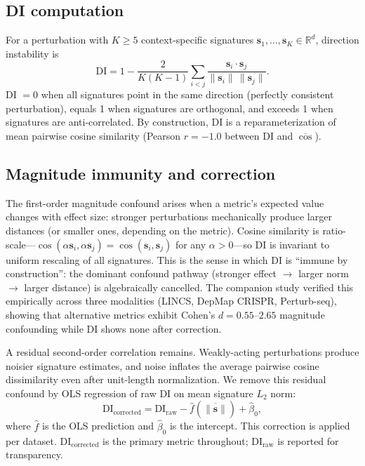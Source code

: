 \documentclass[11pt]{article}
\begin{document}
\subsection{DI computation}

For a perturbation with $K \geq 5$ context-specific signatures
$\mathbf{s}_1, \ldots, \mathbf{s}_K \in \mathbb{R}^d$, direction
instability is
\begin{equation}
\mathrm{DI} = 1 - \frac{2}{K(K-1)} \sum_{i < j}
\frac{\mathbf{s}_i \cdot \mathbf{s}_j}
     {\|\mathbf{s}_i\| \, \|\mathbf{s}_j\|}.
\label{eq:di}
\end{equation}
DI $= 0$ when all signatures point in the same direction (perfectly
consistent perturbation), equals 1 when signatures are orthogonal,
and exceeds 1 when signatures are anti-correlated.  By
construction, DI is a reparameterization of mean pairwise cosine
similarity (Pearson $r = -1.0$ between DI and $\overline{\cos}$).

\subsection{Magnitude immunity and correction}

The first-order magnitude confound arises when a metric's expected value
changes with effect size: stronger perturbations mechanically produce
larger distances (or smaller ones, depending on the metric).  Cosine
similarity is ratio-scale---$\cos(\alpha \mathbf{s}_i,
\alpha \mathbf{s}_j) = \cos(\mathbf{s}_i, \mathbf{s}_j)$ for any
$\alpha > 0$---so DI is invariant to uniform rescaling of all
signatures.  This is the sense in which DI is ``immune by
construction'': the dominant confound pathway (stronger effect
$\to$ larger norm $\to$ larger distance) is algebraically cancelled.
The companion study \citep{tower2026confound} verified this empirically
across three modalities (LINCS, DepMap CRISPR, Perturb-seq), showing
that alternative metrics exhibit Cohen's $d = 0.55$--$2.65$ magnitude
confounding while DI shows none after correction.

A residual second-order correlation remains.  Weakly-acting
perturbations produce noisier signature estimates, and noise inflates
the average pairwise cosine dissimilarity even after unit-length
normalization.  We remove this residual confound by OLS regression of
raw DI on mean signature $L_2$ norm:
\begin{equation}
\mathrm{DI}_{\mathrm{corrected}} = \mathrm{DI}_{\mathrm{raw}}
  - \hat{f}(\overline{\|\mathbf{s}\|}) + \hat{\beta}_0,
\label{eq:magnitude}
\end{equation}
where $\hat{f}$ is the OLS prediction and $\hat{\beta}_0$ is the
intercept.  This correction is applied per dataset.
$\mathrm{DI}_{\mathrm{corrected}}$ is the primary metric throughout;
$\mathrm{DI}_{\mathrm{raw}}$ is reported for transparency.
\end{document}
